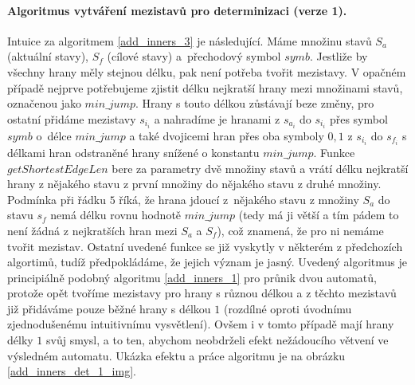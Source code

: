 \paragraph{Algoritmus vytváření mezistavů pro determinizaci (verze 1).} Intuice za algoritmem \ref{add_inners_3} je následující. Máme množinu stavů $S_a$ (aktuální stavy), $S_f$ (cílové stavy) a~přechodový symbol $symb$. Jestliže by všechny hrany měly stejnou délku, pak není potřeba tvořit mezistavy. V opačném případě nejprve potřebujeme zjistit délku nejkratší hrany mezi množinami stavů, označenou jako $min\_jump$. Hrany s touto délkou zůstávají beze změny, pro ostatní přidáme mezistavy $s_{i_i}$ a nahradíme je hranami z $s_{a_i}$ do $s_{i_i}$ přes symbol $symb$ o~délce $min\_jump$ a také dvojicemi hran přes oba symboly $0,1$ z $s_{i_i}$ do $s_{f_i}$ s délkami hran odstraněné hrany snížené o konstantu $min\_jump$. Funkce $getShortestEdgeLen$ bere za parametry dvě množiny stavů a vrátí délku nejkratší hrany z nějakého stavu z první množiny do nějakého stavu z druhé množiny. Podmínka při řádku $5$ říká, že hrana jdoucí z~nějakého stavu z množiny $S_a$ do stavu $s_f$ nemá délku rovnu hodnotě $min\_jump$ (tedy má ji větší a tím pádem to není žádná z nejkratších hran mezi $S_a$ a $S_f$), což znamená, že pro ni nemáme tvořit mezistav. Ostatní uvedené funkce se již vyskytly v některém z předchozích algortimů, tudíž předpokládáme, že jejich význam je jasný. Uvedený algoritmus je principiálně podobný algoritmu \ref{add_inners_1} pro průnik dvou automatů, protože opět tvoříme mezistavy pro hrany s různou délkou a z těchto mezistavů již přidáváme pouze běžné hrany s délkou $1$ (rozdílné oproti úvodnímu zjednodušenému intuitivnímu vysvětlení). Ovšem i v tomto případě mají hrany délky $1$ svůj smysl, a to ten, abychom neobdrželi efekt nežádoucího větvení ve výsledném automatu. Ukázka efektu a práce algoritmu je na obrázku \ref{add_inners_det_1_img}.

